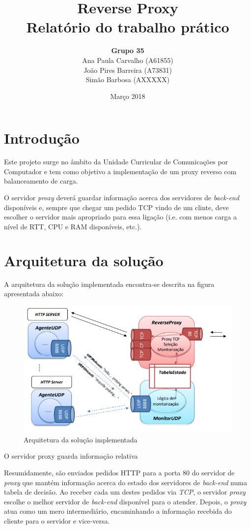 \documentclass{article}
\title{
       \vspace{60px}
       \Huge \textbf{Reverse Proxy} \\[15px]
       \Large \textbf{Relatório do trabalho prático}
       \vspace{100px}
      }
\author{
        \begin{tabular}{c}
            \textbf{Grupo 35} \\[5px]
                Ana Paula Carvalho (A61855) \\
                João Pires Barreira (A73831) \\
                Simão Barbosa (AXXXXX)
        \end{tabular}
       }
\date{Março 2018}
\begin{document}
\maketitle

\newpage
\section{Introdução}

Este projeto surge no âmbito da Unidade Curricular de Comunicações por Computador e tem como objetivo a implementação de um proxy reverso com balanceamento de carga.

O servidor \emph{proxy} deverá guardar informação acerca dos servidores de \emph{back-end} disponíveis e, sempre que chegar um pedido TCP vindo de um clinte, deve escolher o servidor mais apropriado para essa ligação (i.e. com menos carga a nível de RTT, CPU e RAM disponíveis, etc.).

\section{Arquitetura da solução}

A arquitetura da solução implementada encontra-se descrita na figura apresentada abaixo:

\begin{figure}[H]
    \centering
    \includegraphics[scale=0.7]{img/arquitetura.PNG}
    \caption{Arquitetura da solução implementada}
\end{figure}

O servidor proxy guarda informação relativa

Resumidamente, são enviados pedidos HTTP para a porta 80 do servidor de \emph{proxy} que mantém informação acerca do estado dos servidores de \emph{back-end} numa tabela de decisão. Ao receber cada um destes pedidos via \emph{TCP}, o servidor \emph{proxy} escolhe o melhor servidor de \emph{back-end} disponível para o atender. Depois, o \emph{proxy} atua como um mero intermediário, encaminhando a informação recebida do cliente para o servidor e vice-versa.
\end{document}

